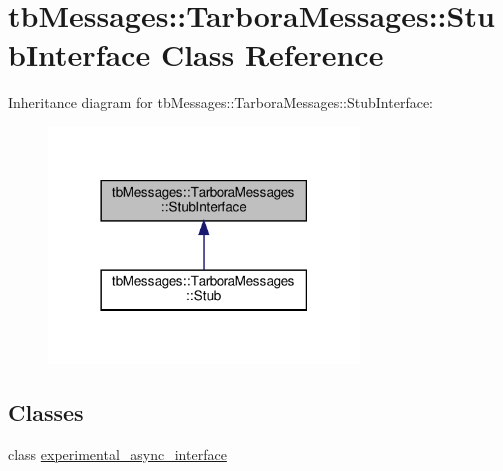 \hypertarget{classtbMessages_1_1TarboraMessages_1_1StubInterface}{}\section{tb\+Messages\+:\+:Tarbora\+Messages\+:\+:Stub\+Interface Class Reference}
\label{classtbMessages_1_1TarboraMessages_1_1StubInterface}


Inheritance diagram for tb\+Messages\+:\+:Tarbora\+Messages\+:\+:Stub\+Interface\+:
\nopagebreak
\begin{figure}[H]
\begin{center}
\leavevmode
\includegraphics[width=234pt]{classtbMessages_1_1TarboraMessages_1_1StubInterface__inherit__graph}
\end{center}
\end{figure}
\subsection*{Classes}
\begin{DoxyCompactItemize}
\item 
class \hyperlink{classtbMessages_1_1TarboraMessages_1_1StubInterface_1_1experimental__async__interface}{experimental\+\_\+async\+\_\+interface}
\end{DoxyCompactItemize}
